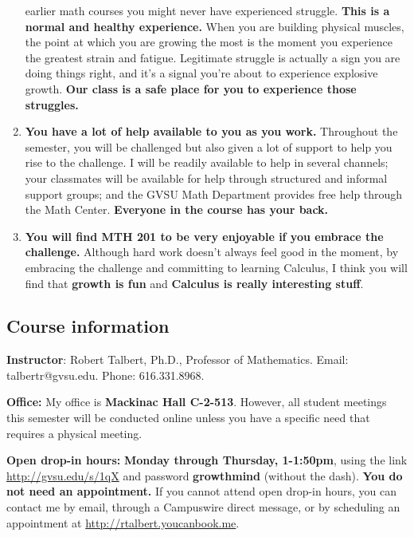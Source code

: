 \documentclass[]{article}
\begin{document}
\begin{enumerate}
  earlier math courses you might never have experienced struggle.
  \textbf{This is a normal and healthy experience.} When you are
  building physical muscles, the point at which you are growing the most
  is the moment you experience the greatest strain and fatigue.
  Legitimate struggle is actually a sign you are doing things right, and
  it's a signal you're about to experience explosive growth. \textbf{Our
  class is a safe place for you to experience those struggles.}
\item
  \textbf{You have a lot of help available to you as you work.}
  Throughout the semester, you will be challenged but also given a lot
  of support to help you rise to the challenge. I will be readily
  available to help in several channels; your classmates will be
  available for help through structured and informal support groups; and
  the GVSU Math Department provides free help through the Math Center.
  \textbf{Everyone in the course has your back.}
\item
  \textbf{You will find MTH 201 to be very enjoyable if you embrace the
  challenge.} Although hard work doesn't always feel good in the moment,
  by embracing the challenge and committing to learning Calculus, I
  think you will find that \textbf{growth is fun} and \textbf{Calculus
  is really interesting stuff}.
\end{enumerate}

\vfill \eject

\hypertarget{course-information}{%
\subsection{Course information}\label{course-information}}

\textbf{Instructor}: Robert Talbert, Ph.D., Professor of Mathematics.
Email: talbertr@gvsu.edu. Phone: 616.331.8968.

\textbf{Office:} My office is \textbf{Mackinac Hall C-2-513}. However, all
student meetings this semester will be conducted online unless you have
a specific need that requires a physical meeting.

\textbf{Open drop-in hours:} \textbf{Monday through Thursday, 1-1:50pm},
using the link \url{http://gvsu.edu/s/1qX} and password
\textbf{growthmind} (without the dash). \textbf{You do not need an appointment.} If you
cannot attend open drop-in hours, you can contact me by email, through a
Campuswire direct message, or by scheduling an appointment at
\url{http://rtalbert.youcanbook.me}.
\end{document}
